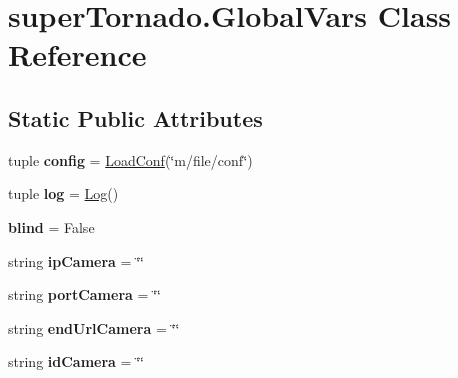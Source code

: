 \hypertarget{classsuper_tornado_1_1_global_vars}{\section{super\-Tornado.\-Global\-Vars Class Reference}
\label{classsuper_tornado_1_1_global_vars}
}
\subsection*{Static Public Attributes}
\begin{DoxyCompactItemize}
\item 
\hypertarget{classsuper_tornado_1_1_global_vars_a0091cf90c3955b9dd9917e441d6d307f}{tuple {\bfseries config} = \hyperlink{classm_1_1load_conf_1_1_load_conf}{Load\-Conf}(\char`\"{}m/file/conf\char`\"{})}\label{classsuper_tornado_1_1_global_vars_a0091cf90c3955b9dd9917e441d6d307f}

\item 
\hypertarget{classsuper_tornado_1_1_global_vars_a027c191330c93fb0ce920d0c0cd7b8b2}{tuple {\bfseries log} = \hyperlink{classm_1_1log_1_1_log}{Log}()}\label{classsuper_tornado_1_1_global_vars_a027c191330c93fb0ce920d0c0cd7b8b2}

\item 
\hypertarget{classsuper_tornado_1_1_global_vars_a88c8b1da2e0b050af8a379a117440a44}{{\bfseries blind} = False}\label{classsuper_tornado_1_1_global_vars_a88c8b1da2e0b050af8a379a117440a44}

\item 
\hypertarget{classsuper_tornado_1_1_global_vars_a90ce11ba50f379aeb590c8e75a72a440}{string {\bfseries ip\-Camera} = \char`\"{}\char`\"{}}\label{classsuper_tornado_1_1_global_vars_a90ce11ba50f379aeb590c8e75a72a440}

\item 
\hypertarget{classsuper_tornado_1_1_global_vars_a1ac437cbfa5d3a6d35b079411ee6fb0a}{string {\bfseries port\-Camera} = \char`\"{}\char`\"{}}\label{classsuper_tornado_1_1_global_vars_a1ac437cbfa5d3a6d35b079411ee6fb0a}

\item 
\hypertarget{classsuper_tornado_1_1_global_vars_a6e47041f62f9a703fc68916c2bb9cbe5}{string {\bfseries end\-Url\-Camera} = \char`\"{}\char`\"{}}\label{classsuper_tornado_1_1_global_vars_a6e47041f62f9a703fc68916c2bb9cbe5}

\item 
\hypertarget{classsuper_tornado_1_1_global_vars_ac11b9f2e40a970b6254a02a6683d0ea9}{string {\bfseries id\-Camera} = \char`\"{}\char`\"{}}\label{classsuper_tornado_1_1_global_vars_ac11b9f2e40a970b6254a02a6683d0ea9}


\end{DoxyCompactItemize}
